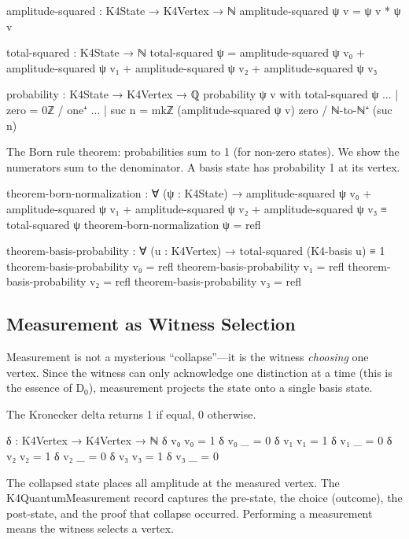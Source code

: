 \documentclass[11pt,a4paper]{book}
\def\texttt#1{#1}%
\begin{document}
\begin{code}
amplitude-squared : K4State → K4Vertex → ℕ
amplitude-squared ψ v = ψ v * ψ v

total-squared : K4State → ℕ
total-squared ψ = amplitude-squared ψ v₀ + amplitude-squared ψ v₁ 
                + amplitude-squared ψ v₂ + amplitude-squared ψ v₃

probability : K4State → K4Vertex → ℚ
probability ψ v with total-squared ψ
... | zero    = 0ℤ / one⁺
... | suc n   = mkℤ (amplitude-squared ψ v) zero / ℕ-to-ℕ⁺ (suc n)
\end{code}

The Born rule theorem: probabilities sum to 1 (for non-zero states). We show the numerators sum to the denominator. A basis state has probability 1 at its vertex.

\begin{code}
theorem-born-normalization : ∀ (ψ : K4State) →
  amplitude-squared ψ v₀ + amplitude-squared ψ v₁ 
  + amplitude-squared ψ v₂ + amplitude-squared ψ v₃ 
  ≡ total-squared ψ
theorem-born-normalization ψ = refl

theorem-basis-probability : ∀ (u : K4Vertex) →
  total-squared (K4-basis u) ≡ 1
theorem-basis-probability v₀ = refl
theorem-basis-probability v₁ = refl
theorem-basis-probability v₂ = refl
theorem-basis-probability v₃ = refl
\end{code}

\subsection{Measurement as Witness Selection}

Measurement is not a mysterious ``collapse''---it is the witness 
\emph{choosing} one vertex. Since the witness can only acknowledge one 
distinction at a time (this is the essence of D$_0$), measurement 
projects the state onto a single basis state.

The Kronecker delta returns 1 if equal, 0 otherwise.

\begin{code}
δ : K4Vertex → K4Vertex → ℕ
δ v₀ v₀ = 1
δ v₀ _  = 0
δ v₁ v₁ = 1
δ v₁ _  = 0
δ v₂ v₂ = 1
δ v₂ _  = 0
δ v₃ v₃ = 1
δ v₃ _  = 0
\end{code}

The collapsed state places all amplitude at the measured vertex. The \texttt{K4QuantumMeasurement} record captures the pre-state, the choice (outcome), the post-state, and the proof that collapse occurred. Performing a measurement means the witness selects a vertex.
\end{document}

